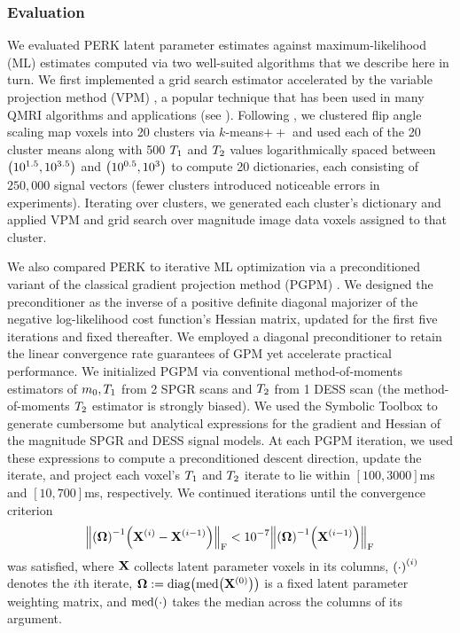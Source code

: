 \subsubsection{Evaluation}
\label{sss,perk,exp,meth,eval}

We evaluated PERK latent parameter estimates
against maximum-likelihood (ML) estimates
computed via two well-suited algorithms
that we describe here in turn.
We first implemented a grid search estimator
accelerated by the variable projection method (VPM) \cite{golub:03:snl},
a popular technique 
that has been used
in many QMRI algorithms and applications
(see \eg 
\cite{%
	gong:92:aft,%
	haldar:07:mle,%
	hernando:08:jeo,%
	barral:10:arm,%
	ma:13:mrf,%
	mcgivney:14:scf,%
	trzasko:13:etf,%
	zhao:15:amp,%
	zhao:16:mlr,%
	he:16:ahd,%
	nataraj:17:oms%
}%
).
Following \cite{nataraj:17:oms},
we clustered flip angle scaling map voxels into 20 clusters
via $k$-means$++$ \cite{arthur:07:kmt}
and used each of the 20 cluster means
along with 
500 $T_1$ and $T_2$ values
logarithmically spaced 
between $\paren{{10}^{1.5}, {10}^{3.5}}$ 
and $\paren{{10}^{0.5},{10}^{3}}$
to compute 20 dictionaries,
each consisting of $250,000$ signal vectors
(fewer clusters introduced noticeable errors
in experiments).
Iterating over clusters,
we generated each cluster's dictionary
and applied VPM and grid search
over magnitude image data voxels
assigned to that cluster.

We also compared PERK 
to iterative ML optimization
via a preconditioned variant 
of the classical gradient projection method (PGPM) \cite{rosen:60:tgp}.
We designed the preconditioner 
as the inverse 
of a positive definite diagonal majorizer
of the negative log-likelihood cost function's Hessian matrix,
updated for the first five iterations
and fixed thereafter. 
We employed a diagonal preconditioner
to retain the linear convergence rate guarantees
of GPM \cite{bertsekas:82:pnm}
yet accelerate practical performance.
We initialized PGPM 
via conventional method-of-moments estimators
of $m_0,T_1$ from 2 SPGR scans \cite{gupta:77:anl}
and $T_2$ from 1 DESS scan \cite{bruder:88:ans}
(the method-of-moments $T_2$ estimator is strongly biased). 
We used the \matlab Symbolic Toolbox
to generate cumbersome but analytical expressions
for the gradient and Hessian 
of the magnitude SPGR and DESS signal models.
At each PGPM iteration,
we used these expressions
to compute a preconditioned descent direction,
update the iterate,
and project each voxel's $T_1$ and $T_2$ iterate
to lie within $[100,3000]$ms and $[10,700]$ms,
respectively.
We continued iterations
until the convergence criterion
\begin{align}
	\frob{\inv{\bmOmega}\paren{\iter{\bmX}{i}-\iter{\bmX}{i-1}}} 
		< 10^{-7} \frob{\inv{\bmOmega}\paren{\iter{\bmX}{i-1}}}
	\label{eq:perk,conv-crit}
\end{align}
was satisfied,
where $\mathbf{X}$ collects latent parameter voxels 
in its columns,
$\iter{\paren{\cdot}}{i}$ denotes the $i$th iterate,
$\bmOmega := \diag{\med{\iter{\bmX}{0}}}$ 
is a fixed latent parameter weighting matrix,
and $\med{\cdot}$ takes the median
across the columns of its argument.

